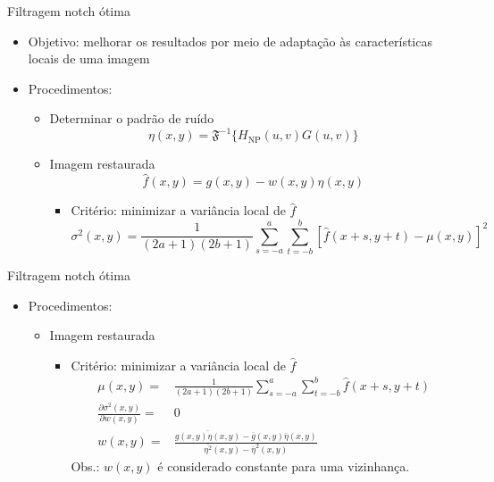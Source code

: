 \begin{slide}{Filtragem notch ótima}
	\begin{itemize}
		\item Objetivo: melhorar os resultados por meio de adaptação às características locais de uma imagem
		\item Procedimentos:\\
		\begin{itemize}
			\item Determinar o padrão de ruído
				\begin{equation*}
					\eta(x,y) = \mathfrak F^{-1}\{H_\text{NP}(u,v)G(u,v)\}
				\end{equation*}
			\item Imagem restaurada
				\begin{equation*}
					\hat f(x,y) = g(x,y) - w(x,y)\eta(x,y)
				\end{equation*}
				\begin{itemize}
					\item Critério: minimizar a variância local de $\hat f$
						\begin{equation*}
							\sigma^2(x,y) = \frac{1}{(2a+1)(2b+1)}\sum_{s=-a}^a\sum_{t=-b}^b\left [\hat f(x+s,y+t)-\mu(x,y)\right ]^2
						\end{equation*}
				\end{itemize}
		\end{itemize}
	\end{itemize}
\end{slide}

\begin{slide}{Filtragem notch ótima}
	\begin{itemize}
		\item Procedimentos:\\
		\begin{itemize}
			\item Imagem restaurada
				\begin{itemize}
					\item Critério: minimizar a variância local de $\hat f$
						\begin{align*}
							\mu(x,y) =& \frac{1}{(2a+1)(2b+1)}\sum_{s=-a}^a\sum_{t=-b}^b \hat f(x+s,y+t)\\
							\frac{\partial \sigma^2(x,y)}{\partial w(x,y)} =& 0\\
							w(x,y) =& \frac{\overline{g(x,y)\eta(x,y)}-\overline g(x,y)\overline\eta(x,y)}{\overline{\eta^2}(x,y) - \overline\eta^2(x,y)}
						\end{align*}
						Obs.: $w(x,y)$ é considerado constante para uma vizinhança.
				\end{itemize}
		\end{itemize}
	\end{itemize}
\end{slide}

